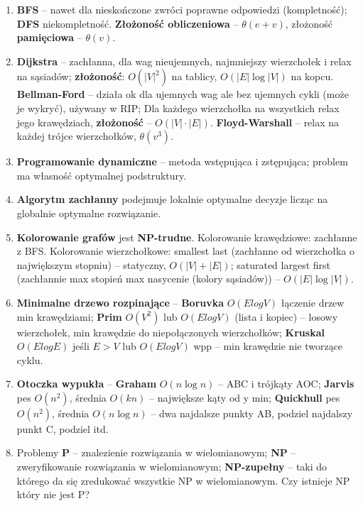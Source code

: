 \documentclass[12pt]{article}
\begin{document}
\begin{enumerate}
        \item \textbf{BFS} -- nawet dla nieskończone zwróci poprawne odpowiedzi (kompletność); \textbf{DFS} niekompletność.
        \textbf{Złożoność obliczeniowa} -- $\theta(e + v)$, złożoność \textbf{pamięciowa} --  $\theta(v)$.

        \item \textbf{Dijkstra} -- zachłanna, dla wag nieujemnych, najmniejszy wierzchołek i relax na sąsiadów;
        \textbf{złożoność}: $O(|V|^2)$ na tablicy, $O(|E|\log|V|)$ na kopcu.
        \textbf{Bellman-Ford} -- działa ok dla ujemnych wag ale bez ujemnych cykli (może je wykryć), używany w RIP;
        Dla każdego wierzchołka na wszystkich relax jego krawędziach, \textbf{złożoność} -- $O(|V|\cdot|E|)$.
        \textbf{Floyd-Warshall} -- relax na każdej trójce wierzchołków, $\theta(v^3)$.

        \item \textbf{Programowanie dynamiczne} -- metoda wstępująca i zstępująca;
        problem ma własność optymalnej
        podstruktury.

        \item \textbf{Algorytm zachłanny} podejmuje lokalnie optymalne decyzje licząc na globalnie optymalne rozwiązanie.

        \item  \textbf{Kolorowanie grafów} jest \textbf{NP-trudne}.
        Kolorowanie krawędziowe: zachłanne z BFS\@.
        Kolorowanie wierzchołkowe: smallest last (zachłanne od wierzchołka o największym stopniu) -- statyczny, $O(|V|+|E|)$;
        saturated largest first (zachłannie max stopień max nasycenie (kolory sąsiadów)) -- $O(|E|\log |V|)$.

        \item \textbf{Minimalne drzewo rozpinające} -- \textbf{Boruvka} $O(ElogV)$ łączenie drzew min krawędziami;
        \textbf{Prim} $O(V^2)$ lub $O(ElogV)$ (lista i kopiec) -- losowy wierzchołek, min krawędzie do niepołączonych
        wierzchołków; \textbf{Kruskal}  $O(ElogE)$ jeśli $E > V$ lub $O(ElogV)$ wpp -- min krawędzie nie tworzące cyklu.

        \item \textbf{Otoczka wypukła} -- \textbf{Graham}  $O(n \log n)$ -- ABC i trójkąty AOC; \textbf{Jarvis}
        pes $O(n^2)$, średnia $O(kn)$ -- największe kąty od y min; \textbf{Quickhull} pes $O(n^2)$, średnia
        $O(n \log n)$ -- dwa najdalsze punkty AB, podziel najdalszy punkt C, podziel itd.

        \item Problemy \textbf{P} -- znalezienie rozwiązania w wielomianowym; \textbf{NP} -- zweryfikowanie rozwiązania
        w wielomianowym; \textbf{NP-zupełny} -- taki do którego da się zredukować wszystkie NP w wielomianowym.
        Czy istnieje NP który nie jest P?


\end{enumerate}
\end{document}
